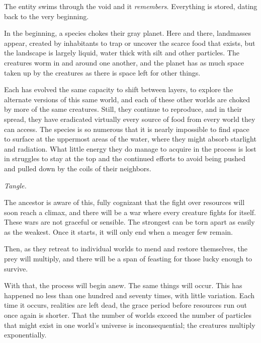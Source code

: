 





The entity swims through the void and it \emph{remembers}.  Everything is stored, dating back to the very beginning.



In the beginning, a species chokes their gray planet.  Here and there, landmasses appear, created by inhabitants to trap or uncover the scarce food that exists, but the landscape is largely liquid, water thick with silt and other particles.  The creatures worm in and around one another, and the planet has as much space taken up by the creatures as there is space left for other things.



Each has evolved the same capacity to shift between layers, to explore the alternate versions of this same world, and each of these other worlds are choked by more of the same creatures.  Still, they continue to reproduce, and in their spread, they have eradicated virtually every source of food from every world they can access.  The species is so numerous that it is nearly impossible to find space to surface at the uppermost areas of the water, where they might absorb starlight and radiation.  What little energy they do manage to acquire in the process is lost in struggles to stay at the top and the continued efforts to avoid being pushed and pulled down by the coils of their neighbors.



\emph{Tangle.}



The ancestor is aware of this, fully cognizant that the fight over resources will soon reach a climax, and there will be a war where every creature fights for itself.  These wars are not graceful or sensible.  The strongest can be torn apart as easily as the weakest.  Once it starts, it will only end when a meager few remain.



Then, as they retreat to individual worlds to mend and restore themselves, the prey will multiply, and there will be a span of feasting for those lucky enough to survive.



With that, the process will begin anew.  The same things will occur.  This has happened no less than one hundred and seventy times, with little variation.  Each time it occurs, realities are left dead, the grace period before resources run out once again is shorter.  That the number of worlds exceed the number of particles that might exist in one world's universe is inconsequential; the creatures multiply exponentially.



